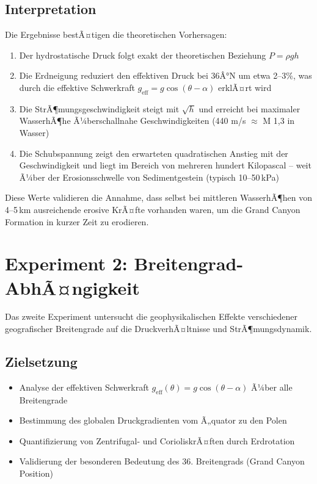 ﻿\documentclass[12pt,a4paper]{report}
\begin{document}
\subsection{Interpretation}

Die Ergebnisse bestÃ¤tigen die theoretischen Vorhersagen:

\begin{enumerate}
	\item Der hydrostatische Druck folgt exakt der theoretischen Beziehung $P = \rho g h$
	
	\item Die Erdneigung reduziert den effektiven Druck bei 36Â°N um etwa 2--3\%, was durch die effektive Schwerkraft $g_{\text{eff}} = g \cos(\theta - \alpha)$ erklÃ¤rt wird
	
	\item Die StrÃ¶mungsgeschwindigkeit steigt mit $\sqrt{h}$ und erreicht bei maximaler WasserhÃ¶he Ã¼berschallnahe Geschwindigkeiten (440 m/s $\approx$ M 1,3 in Wasser)
	
	\item Die Schubspannung zeigt den erwarteten quadratischen Anstieg mit der Geschwindigkeit und liegt im Bereich von mehreren hundert Kilopascal -- weit Ã¼ber der Erosionsschwelle von Sedimentgestein (typisch 10--50\,kPa)
\end{enumerate}

Diese Werte validieren die Annahme, dass selbst bei mittleren WasserhÃ¶hen von 4--5\,km ausreichende erosive KrÃ¤fte vorhanden waren, um die Grand Canyon Formation in kurzer Zeit zu erodieren.

\section{Experiment 2: Breitengrad-AbhÃ¤ngigkeit}

Das zweite Experiment untersucht die geophysikalischen Effekte verschiedener geografischer Breitengrade auf die DruckverhÃ¤ltnisse und StrÃ¶mungsdynamik.

\subsection{Zielsetzung}

\begin{itemize}
	\item Analyse der effektiven Schwerkraft $g_{\text{eff}}(\theta) = g \cos(\theta - \alpha)$ Ã¼ber alle Breitengrade
	\item Bestimmung des globalen Druckgradienten vom Ã„quator zu den Polen
	\item Quantifizierung von Zentrifugal- und CorioliskrÃ¤ften durch Erdrotation
	\item Validierung der besonderen Bedeutung des 36. Breitengrads (Grand Canyon Position)
\end{itemize}
\end{document}
